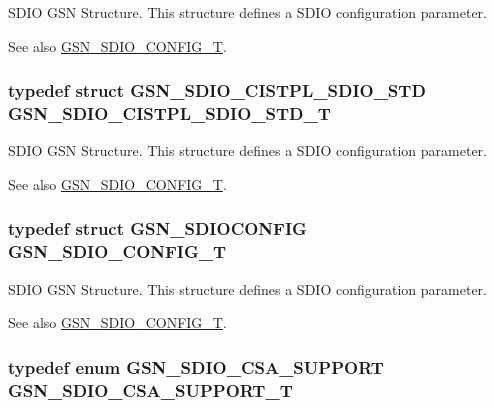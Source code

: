SDIO GSN Structure. This structure defines a SDIO configuration parameter. 

\begin{DoxySeeAlso}{See also}
\hyperlink{a00653_ga741fda4dc2cd93143a8a73ddaace7de8}{GSN\_\-SDIO\_\-CONFIG\_\-T}. 
\end{DoxySeeAlso}
\hypertarget{a00653_gaddb935698da8d7e7e517565c91ddc01b}{
\subsubsection[{GSN\_\-SDIO\_\-CISTPL\_\-SDIO\_\-STD\_\-T}]{\setlength{\rightskip}{0pt plus 5cm}typedef struct {\bf GSN\_\-SDIO\_\-CISTPL\_\-SDIO\_\-STD} {\bf GSN\_\-SDIO\_\-CISTPL\_\-SDIO\_\-STD\_\-T}}}
\label{a00653_gaddb935698da8d7e7e517565c91ddc01b}


SDIO GSN Structure. This structure defines a SDIO configuration parameter. 

\begin{DoxySeeAlso}{See also}
\hyperlink{a00653_ga741fda4dc2cd93143a8a73ddaace7de8}{GSN\_\-SDIO\_\-CONFIG\_\-T}. 
\end{DoxySeeAlso}
\hypertarget{a00653_ga741fda4dc2cd93143a8a73ddaace7de8}{
\subsubsection[{GSN\_\-SDIO\_\-CONFIG\_\-T}]{\setlength{\rightskip}{0pt plus 5cm}typedef struct {\bf GSN\_\-SDIOCONFIG}  {\bf GSN\_\-SDIO\_\-CONFIG\_\-T}}}
\label{a00653_ga741fda4dc2cd93143a8a73ddaace7de8}


SDIO GSN Structure. This structure defines a SDIO configuration parameter. 

\begin{DoxySeeAlso}{See also}
\hyperlink{a00653_ga741fda4dc2cd93143a8a73ddaace7de8}{GSN\_\-SDIO\_\-CONFIG\_\-T}. 
\end{DoxySeeAlso}
\hypertarget{a00653_ga0b8def9125739921da58093450df058e}{
\subsubsection[{GSN\_\-SDIO\_\-CSA\_\-SUPPORT\_\-T}]{\setlength{\rightskip}{0pt plus 5cm}typedef enum {\bf GSN\_\-SDIO\_\-CSA\_\-SUPPORT} {\bf GSN\_\-SDIO\_\-CSA\_\-SUPPORT\_\-T}}}
\label{a00653_ga0b8def9125739921da58093450df058e}


